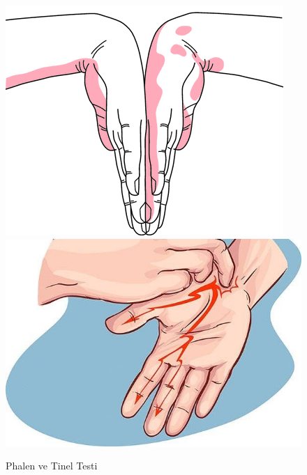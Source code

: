\documentclass[12pt,twoside]{deuthesis}
\begin{document}
\begin{figure}

{\centering \includegraphics[width=0.49\linewidth,height=0.18\textheight]{figure/phalen} \includegraphics[width=0.49\linewidth,height=0.18\textheight]{figure/tinel} 

}

\caption{Phalen ve Tinel Testi}\label{fig:unnamed-chunk-3}
\end{figure}
\end{document}
